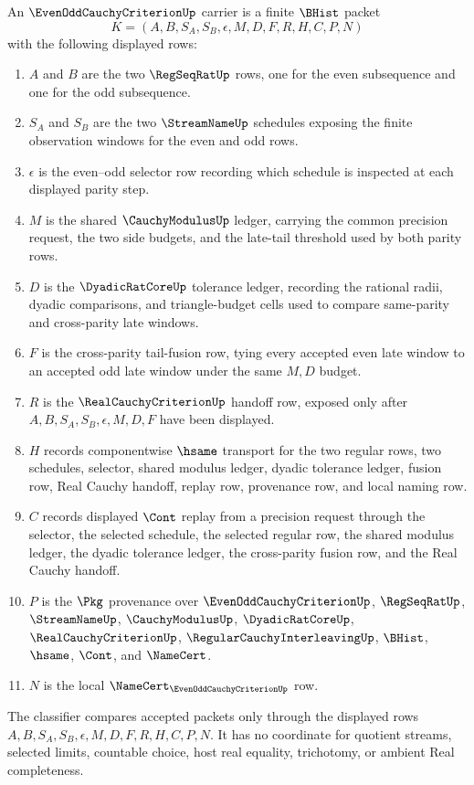 \begin{definition}
\label{def:even-odd-cauchy-criterion-carrier}
An $\EvenOddCauchyCriterionUp$ carrier is a finite $\BHist$ packet
$$
K=(A,B,S_A,S_B,\epsilon,M,D,F,R,H,C,P,N)
$$
with the following displayed rows:
\begin{enumerate}
\item $A$ and $B$ are the two $\RegSeqRatUp$ rows, one for the even subsequence and one for the odd subsequence.
\item $S_A$ and $S_B$ are the two $\StreamNameUp$ schedules exposing the finite observation windows for the even and odd rows.
\item $\epsilon$ is the even--odd selector row recording which schedule is inspected at each displayed parity step.
\item $M$ is the shared $\CauchyModulusUp$ ledger, carrying the common precision request, the two side budgets, and the late-tail threshold used by both parity rows.
\item $D$ is the $\DyadicRatCoreUp$ tolerance ledger, recording the rational radii, dyadic comparisons, and triangle-budget cells used to compare same-parity and cross-parity late windows.
\item $F$ is the cross-parity tail-fusion row, tying every accepted even late window to an accepted odd late window under the same $M,D$ budget.
\item $R$ is the $\RealCauchyCriterionUp$ handoff row, exposed only after $A,B,S_A,S_B,\epsilon,M,D,F$ have been displayed.
\item $H$ records componentwise $\hsame$ transport for the two regular rows, two schedules, selector, shared modulus ledger, dyadic tolerance ledger, fusion row, Real Cauchy handoff, replay row, provenance row, and local naming row.
\item $C$ records displayed $\Cont$ replay from a precision request through the selector, the selected schedule, the selected regular row, the shared modulus ledger, the dyadic tolerance ledger, the cross-parity fusion row, and the Real Cauchy handoff.
\item $P$ is the $\Pkg$ provenance over $\EvenOddCauchyCriterionUp$, $\RegSeqRatUp$, $\StreamNameUp$, $\CauchyModulusUp$, $\DyadicRatCoreUp$, $\RealCauchyCriterionUp$, $\RegularCauchyInterleavingUp$, $\BHist$, $\hsame$, $\Cont$, and $\NameCert$.
\item $N$ is the local $\NameCert_{\EvenOddCauchyCriterionUp}$ row.
\end{enumerate}
The classifier compares accepted packets only through the displayed rows $A,B,S_A,S_B,\epsilon,M,D,F,R,H,C,P,N$. It has no coordinate for quotient streams, selected limits, countable choice, host real equality, trichotomy, or ambient Real completeness.
\end{definition}

